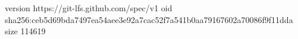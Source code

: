 version https://git-lfs.github.com/spec/v1
oid sha256:ceb5d69bda7497ea54aee3e92a7cac52f7a541b0aa79167602a70086f9f11dda
size 114619
